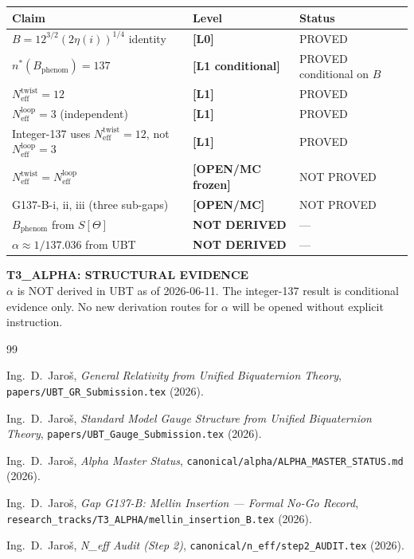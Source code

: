 \documentclass[12pt,a4paper]{article}
\theoremstyle{definition}
\theoremstyle{remark}
\newcommand{\Lzero}{\textbf{[L0]}}
\newcommand{\Lone}{\textbf{[L1]}}
\newcommand{\COND}{\textbf{[L1 conditional]}}
\begin{document}
\begin{center}
\begin{tabular}{lll}
\toprule
\textbf{Claim} & \textbf{Level} & \textbf{Status} \\
\midrule
$B = 12^{3/2}(2\eta(i))^{1/4}$ identity & \Lzero & PROVED \\
$n^*(B_{\mathrm{phenom}}) = 137$ & \COND & PROVED conditional on $B$ \\
$N_{\mathrm{eff}}^{\mathrm{twist}} = 12$ & \Lone & PROVED \\
$N_{\mathrm{eff}}^{\mathrm{loop}} = 3$ (independent) & \Lone & PROVED \\
Integer-137 uses $N_{\mathrm{eff}}^{\mathrm{twist}} = 12$,
  not $N_{\mathrm{eff}}^{\mathrm{loop}} = 3$ & \Lone & PROVED \\
$N_{\mathrm{eff}}^{\mathrm{twist}} = N_{\mathrm{eff}}^{\mathrm{loop}}$ & \textbf{[OPEN/MC frozen]} & NOT PROVED \\
G137-B-i, ii, iii (three sub-gaps) & \textbf{[OPEN/MC]} & NOT PROVED \\
$B_{\mathrm{phenom}}$ from $S[\Theta]$ & \textbf{NOT DERIVED} & — \\
$\alpha \approx 1/137.036$ from UBT & \textbf{NOT DERIVED} & — \\
\bottomrule
\end{tabular}
\end{center}

\begin{deadendbox}
\textbf{T3\_ALPHA: STRUCTURAL EVIDENCE}\\[4pt]
$\alpha$ is NOT derived in UBT as of 2026-06-11.  The integer-137 result is
conditional evidence only.  No new derivation routes for $\alpha$ will be
opened without explicit instruction.
\end{deadendbox}

\begin{thebibliography}{99}

  Ing.~D.~Jaroš,
  \textit{General Relativity from Unified Biquaternion Theory},
  \texttt{papers/UBT\_GR\_Submission.tex} (2026).

  Ing.~D.~Jaroš,
  \textit{Standard Model Gauge Structure from Unified Biquaternion Theory},
  \texttt{papers/UBT\_Gauge\_Submission.tex} (2026).

  Ing.~D.~Jaroš,
  \textit{Alpha Master Status},
  \texttt{canonical/alpha/ALPHA\_MASTER\_STATUS.md} (2026).

  Ing.~D.~Jaroš,
  \textit{Gap G137-B: Mellin Insertion — Formal No-Go Record},
  \texttt{research\_tracks/T3\_ALPHA/mellin\_insertion\_B.tex} (2026).

  Ing.~D.~Jaroš,
  \textit{N\_eff Audit (Step 2)},
  \texttt{canonical/n\_eff/step2\_AUDIT.tex} (2026).

\end{thebibliography}

\ifdefined\INCLUDEMODE
\else
\end{document}
